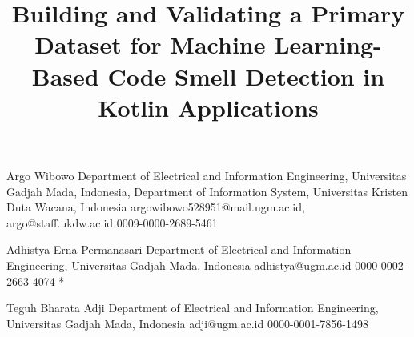 \documentclass[]{einformatica}
\begin{document}

\title{Building and Validating a Primary Dataset for Machine Learning-Based Code Smell Detection in Kotlin Applications}




\EIauthorI
   {Argo}
   {Wibowo}
   {Department of Electrical and Information Engineering, Universitas Gadjah Mada, Indonesia, Department of Information System, Universitas Kristen Duta Wacana, Indonesia}
   {argowibowo528951@mail.ugm.ac.id, argo@staff.ukdw.ac.id}
   {0009-0000-2689-5461} %
   {} %

\EIauthorII
   {Adhistya}
   {Erna Permanasari}
   {Department of Electrical and Information Engineering, Universitas Gadjah Mada, Indonesia}
   {adhistya@ugm.ac.id}
   {0000-0002-2663-4074}
   {*} %
   
\EIauthorIII
   {Teguh}
   {Bharata Adji}
   {Department of Electrical and Information Engineering, Universitas Gadjah Mada, Indonesia}
   {adji@ugm.ac.id}
   {0000-0001-7856-1498}
   {} %
 
\end{document}
